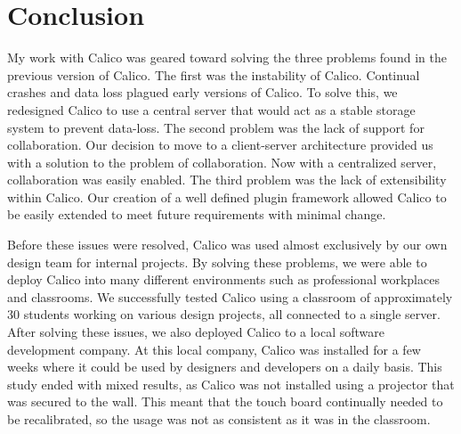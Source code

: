 \chapter{Conclusion}
My work with Calico was geared toward solving the three problems found in the previous version of Calico. The first was the instability of Calico. Continual crashes and data loss plagued early versions of Calico. To solve this, we redesigned Calico to use a central server that would act as a stable storage system to prevent data-loss. The second problem was the lack of support for collaboration. Our decision to move to a client-server architecture provided us with a solution to the problem of collaboration. Now with a centralized server, collaboration was easily enabled. The third problem was the lack of extensibility within Calico. Our creation of a well defined plugin framework allowed Calico to be easily extended to meet future requirements with minimal change.

Before these issues were resolved, Calico was used almost exclusively by our own design team for internal projects. By solving these problems, we were able to deploy Calico into many different environments such as professional workplaces and classrooms. We successfully tested Calico using a classroom of approximately 30 students working on various design projects, all connected to a single server. After solving these issues, we also deployed Calico to a local software development company. At this local company, Calico was installed for a few weeks where it could be used by designers and developers on a daily basis. This study ended with mixed results, as Calico was not installed using a projector that was secured to the wall. This meant that the touch board continually needed to be recalibrated, so the usage was not as consistent as it was in the classroom.